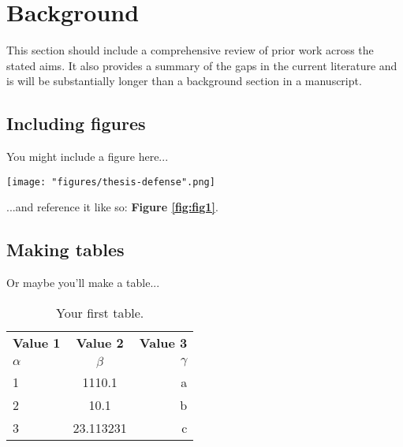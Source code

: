 \center

\section{Background}

\raggedright

This section should include a comprehensive review of prior work across the stated aims. It also provides a summary of the gaps in the current literature and is will be substantially longer than a background section in a manuscript.


\subsection{Including figures}

You might include a figure here...

\begin{figure*}
  \centering
  \texttt{[image: "figures/thesis-defense".png]}
  \caption{\textbf{The best thesis defense is a good thesis offense.} A conceptual illustration of the celebrated thesis \textit{offense}, an ambitious but often effective tactical maneuver.}
  \label{fig:fig1}
\end{figure*}

...and reference it like so: \textbf{Figure \ref{fig:fig1}}.


\subsection{Making tables}

Or maybe you'll make a table...

\begin{table}[h!]
  \begin{center}
    \caption{Your first table.}
    \label{tab:table1}
    \begin{tabular}{l|c|r} %
      \textbf{Value 1} & \textbf{Value 2} & \textbf{Value 3}\\
      $\alpha$ & $\beta$ & $\gamma$ \\
      \hline
      1 & 1110.1 & a\\
      2 & 10.1 & b\\
      3 & 23.113231 & c\\
    \end{tabular}
    \label{table:table1}
  \end{center}
\end{table}

